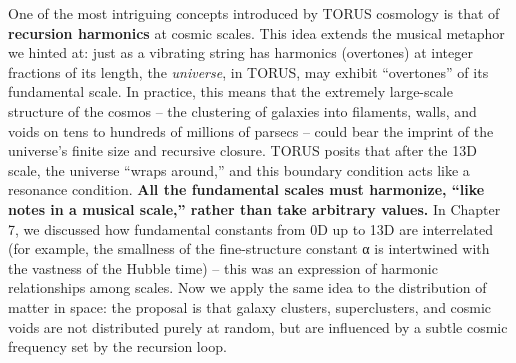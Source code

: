 One of the most intriguing concepts introduced by TORUS cosmology is
that of \textbf{recursion harmonics} at cosmic scales. This idea extends
the musical metaphor we hinted at: just as a vibrating string has
harmonics (overtones) at integer fractions of its length, the
\emph{universe}, in TORUS, may exhibit ``overtones'' of its fundamental
scale. In practice, this means that the extremely large-scale structure
of the cosmos -- the clustering of galaxies into filaments, walls, and
voids on tens to hundreds of millions of parsecs -- could bear the
imprint of the universe's finite size and recursive closure. TORUS
posits that after the 13D scale, the universe ``wraps around,'' and this
boundary condition acts like a resonance condition. \textbf{All the
fundamental scales must harmonize, ``like notes in a musical scale,''
rather than take arbitrary values​.} In Chapter 7, we discussed how
fundamental constants from 0D up to 13D are interrelated (for example,
the smallness of the fine-structure constant α is intertwined with the
vastness of the Hubble time) -- this was an expression of harmonic
relationships among scales. Now we apply the same idea to the
distribution of matter in space: the proposal is that galaxy clusters,
superclusters, and cosmic voids are not distributed purely at random,
but are influenced by a subtle cosmic frequency set by the recursion
loop.

